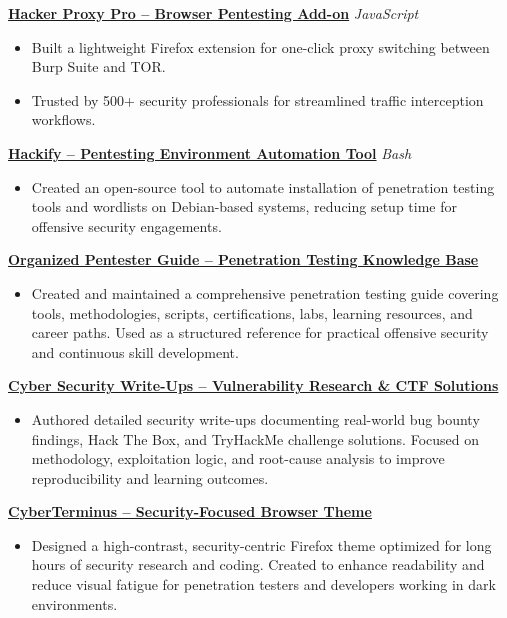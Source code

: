 \documentclass[10pt,a4paper]{article}
\newcommand{\project}[2]{
    \textbf{#1} \hfill \textit{#2}\\[-2pt]
}
\begin{document}
\project{\href{https://addons.mozilla.org/en-US/firefox/addon/hackerproxypro/}{Hacker Proxy Pro -- Browser Pentesting Add-on}}{JavaScript}
\begin{itemize}
    \item Built a lightweight Firefox extension for one-click proxy switching between Burp Suite and TOR.
    \item Trusted by 500+ security professionals for streamlined traffic interception workflows.
\end{itemize}

\project{\href{https://github.com/ZishanAdThandar/hackify}{Hackify -- Pentesting Environment Automation Tool}}{Bash}
\begin{itemize}
    \item Created an open-source tool to automate installation of penetration testing tools and wordlists on Debian-based systems, reducing setup time for offensive security engagements.
\end{itemize}

\project{\href{https://github.com/ZishanAdThandar/pentest}{Organized Pentester Guide -- Penetration Testing Knowledge Base}}{}
\begin{itemize}
    \item Created and maintained a comprehensive penetration testing guide covering tools, methodologies, scripts, certifications, labs, learning resources, and career paths. Used as a structured reference for practical offensive security and continuous skill development.
\end{itemize}

\project{\href{https://zishanhack.com/blog}{Cyber Security Write-Ups -- Vulnerability Research \& CTF Solutions}}{}
\begin{itemize}
    \item Authored detailed security write-ups documenting real-world bug bounty findings, Hack The Box, and TryHackMe challenge solutions. Focused on methodology, exploitation logic, and root-cause analysis to improve reproducibility and learning outcomes.
\end{itemize}

\project{\href{https://addons.mozilla.org/en-US/firefox/addon/zishanadthandar-cyberterminus/}{CyberTerminus -- Security-Focused Browser Theme}}{}
\begin{itemize}
    \item Designed a high-contrast, security-centric Firefox theme optimized for long hours of security research and coding. Created to enhance readability and reduce visual fatigue for penetration testers and developers working in dark environments.
\end{itemize}
\end{document}
